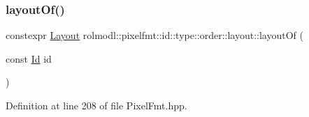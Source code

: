 \subsubsection{\texorpdfstring{layoutOf()}{layoutOf()}}
{\footnotesize\ttfamily constexpr \mbox{\hyperlink{namespacerolmodl_1_1pixelfmt_1_1id_1_1type_1_1order_a4177275b82f1923d1a2f07e1f87f0391}{Layout}} rolmodl\+::pixelfmt\+::id\+::type\+::order\+::layout\+::layout\+Of (\begin{DoxyParamCaption}\item[{const \mbox{\hyperlink{namespacerolmodl_1_1pixelfmt_a96282713e4465ba9211c8fd3a702b52b}{Id}}}]{id }\end{DoxyParamCaption})\hspace{0.3cm}{\ttfamily [noexcept]}}



Definition at line 208 of file Pixel\+Fmt.\+hpp.

